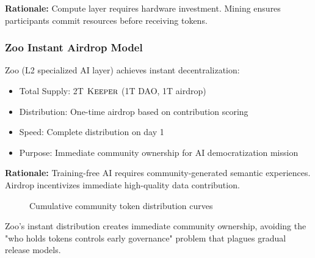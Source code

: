 \textbf{Rationale:} Compute layer requires hardware investment. Mining ensures participants commit resources before receiving tokens.

\subsubsection{Zoo Instant Airdrop Model}

Zoo (L2 specialized AI layer) achieves instant decentralization:
\begin{itemize}
\item Total Supply: 2T $\textsc{Keeper}$ (1T DAO, 1T airdrop)
\item Distribution: One-time airdrop based on contribution scoring
\item Speed: Complete distribution on day 1
\item Purpose: Immediate community ownership for AI democratization mission
\end{itemize}

\textbf{Rationale:} Training-free AI requires community-generated semantic experiences. Airdrop incentivizes immediate high-quality data contribution.

\begin{figure}[h]
\centering
{}
\caption{Cumulative community token distribution curves}
\label{fig:distribution_curves}
\end{figure}

Zoo's instant distribution creates immediate community ownership, avoiding the "who holds tokens controls early governance" problem that plagues gradual release models.

